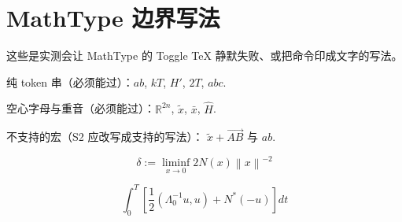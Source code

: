 \documentclass{article}
\begin{document}
\section{MathType 边界写法}

这些是实测会让 MathType 的 Toggle TeX 静默失败、或把命令印成文字的写法。

纯 token 串（必须能过）：$ab$, $kT$, $H'$, $2T$, $abc$.

空心字母与重音（必须能过）：$\mathbb{R}^{2n}$, $\tilde{x}$, $\bar{x}$, $\hat{H}$.

不支持的宏（S2 应改写成支持的写法）：
$\widetilde{x} + \overrightarrow{AB}$ 与 $a \allowbreak b$.

\begin{equation}
\delta := \liminf_{x \to 0} 2 N(x) \left\| x \right\|^{-2}
\end{equation}

\begin{equation}
\int_{0}^{T} \left[ \frac{1}{2} \left( \Lambda_{0}^{-1} u, u \right) + N^{*}(-u) \right] dt
\end{equation}
\end{document}
